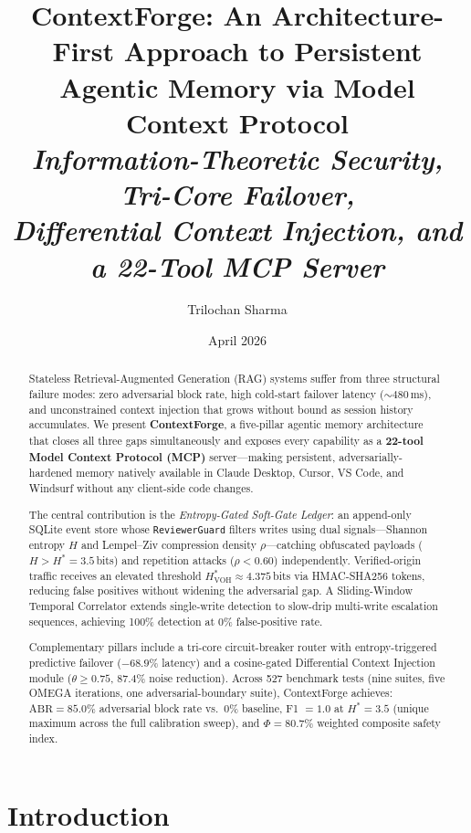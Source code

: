 \documentclass[11pt]{article}
\title{%
  \textbf{ContextForge: An Architecture-First Approach to Persistent\\
    Agentic Memory via Model Context Protocol}\\[0.4em]
  \large\textit{Information-Theoretic Security, Tri-Core Failover,\\
    Differential Context Injection, and a 22-Tool MCP Server}%
}
\author[1]{Trilochan Sharma}
\affil[1]{Independent Researcher \quad \texttt{parnishklpo@gmail.com}}
\date{April 2026}
\begin{document}
\maketitle
\tableofcontents
\newpage

\begin{abstract}
Stateless Retrieval-Augmented Generation (RAG) systems suffer from three
structural failure modes: zero adversarial block rate, high cold-start
failover latency (${\sim}480$\,ms), and unconstrained context injection
that grows without bound as session history accumulates.
We present \textbf{ContextForge}, a five-pillar agentic memory architecture
that closes all three gaps simultaneously and exposes every capability as
a \textbf{22-tool Model Context Protocol (MCP)} server---making persistent,
adversarially-hardened memory natively available in Claude Desktop, Cursor,
VS Code, and Windsurf without any client-side code changes.

The central contribution is the \emph{Entropy-Gated Soft-Gate Ledger}: an
append-only SQLite event store whose \texttt{ReviewerGuard} filters writes
using dual signals---Shannon entropy $H$ and Lempel--Ziv compression
density $\rho$---catching obfuscated payloads ($H > H^{*} = 3.5$\,bits)
and repetition attacks ($\rho < 0.60$) independently.
Verified-origin traffic receives an elevated threshold
$H^{*}_{\mathrm{VOH}} \approx 4.375$\,bits via HMAC-SHA256 tokens,
reducing false positives without widening the adversarial gap.
A Sliding-Window Temporal Correlator extends single-write detection to
slow-drip multi-write escalation sequences, achieving 100\% detection
at 0\% false-positive rate.

Complementary pillars include a tri-core circuit-breaker router with
entropy-triggered predictive failover ($-68.9\%$ latency) and a
cosine-gated Differential Context Injection module ($\theta \geq 0.75$,
$87.4\%$ noise reduction).
Across 527 benchmark tests (nine suites, five OMEGA iterations,
one adversarial-boundary suite), ContextForge achieves:
$\mathrm{ABR} = 85.0\%$ adversarial block rate vs.\ $0\%$ baseline,
F1 $= 1.0$ at $H^{*} = 3.5$ (unique maximum across the full calibration
sweep), and $\Phi = 80.7\%$ weighted composite safety index.
\end{abstract}

\section{Introduction}
\label{sec:intro}
\end{document}
